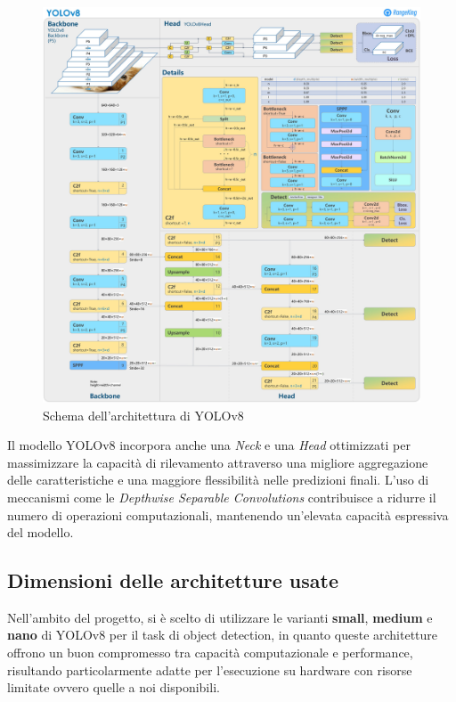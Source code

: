 \begin{figure}[h!]
    \centering
    \includegraphics[width=\textwidth]{yolov8_architecture.jpg}
    \caption{Schema dell'architettura di YOLOv8}
    \label{fig:2}
\end{figure}

Il modello YOLOv8 incorpora anche una \textit{Neck} e una \textit{Head} ottimizzati per massimizzare la capacità di rilevamento attraverso una migliore aggregazione delle caratteristiche e una maggiore flessibilità nelle predizioni finali. L'uso di meccanismi come le \textit{Depthwise Separable Convolutions} contribuisce a ridurre il numero di operazioni computazionali, mantenendo un'elevata capacità espressiva del modello.

\subsection*{Dimensioni delle architetture usate}

Nell'ambito del progetto, si è scelto di utilizzare le varianti \textbf{small}, \textbf{medium} e \textbf{nano} di YOLOv8 per il task di object detection, in quanto queste architetture offrono un buon compromesso tra capacità computazionale e performance, risultando particolarmente adatte per l'esecuzione su hardware con risorse limitate ovvero quelle a noi disponibili.

